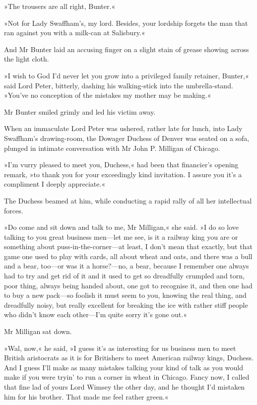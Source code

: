 »The trousers are all right, Bunter.«

»Not for Lady Swaffham's, my lord. Besides, your lordship forgets the man that ran against you with a milk-can at Salisbury.«

And Mr Bunter laid an accusing finger on a slight stain of grease showing across the light cloth.

»I wish to God I'd never let you grow into a privileged family retainer, Bunter,« said Lord Peter, bitterly, dashing his walking-stick into the umbrella-stand. »You've no conception of the mistakes my mother may be making.«

Mr Bunter smiled grimly and led his victim away.

When an immaculate Lord Peter was ushered, rather late for lunch, into Lady Swaffham's drawing-room, the Dowager Duchess of Denver was seated on a sofa, plunged in intimate conversation with Mr John P. Milligan of Chicago.

»I'm vurry pleased to meet you, Duchess,« had been that financier's opening remark, »to thank you for your exceedingly kind invitation. I assure you it's a compliment I deeply appreciate.«

The Duchess beamed at him, while conducting a rapid rally of all her intellectual forces.

»Do come and sit down and talk to me, Mr Milligan,« she said. »I do so love talking to you great business men\allowbreak---\allowbreak let me see, is it a railway king you are or something about puss-in-the-corner\allowbreak---\allowbreak at least, I don't mean that exactly, but that game one used to play with cards, all about wheat and oats, and there was a bull and a bear, too\allowbreak---\allowbreak or was it a horse?---no, a bear, because I remember one always had to try and get rid of it and it used to get so dreadfully crumpled and torn, poor thing, always being handed about, one got to recognise it, and then one had to buy a new pack\allowbreak---\allowbreak so foolish it must seem to you, knowing the real thing, and dreadfully noisy, but really excellent for breaking the ice with rather stiff people who didn't know each other\allowbreak---\allowbreak I'm quite sorry it's gone out.«

Mr Milligan sat down.

»Wal, now,« he said, »I guess it's as interesting for us business men to meet British aristocrats as it is for Britishers to meet American railway kings, Duchess. And I guess I'll make as many mistakes talking your kind of talk as you would make if you were tryin' to run a corner in wheat in Chicago. Fancy now, I called that fine lad of yours Lord Wimsey the other day, and he thought I'd mistaken him for his brother. That made me feel rather green.«

